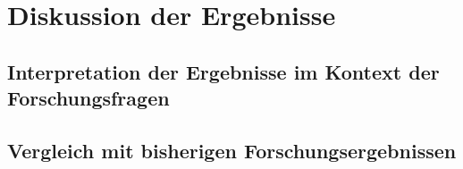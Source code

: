 \section{Diskussion der Ergebnisse}
\label{ch_08Diskussion der Ergebnisse}

\subsection{Interpretation der Ergebnisse im Kontext der Forschungsfragen}
\label{ch_08Interpretation der Ergebnisse im Kontext der Forschungsfragen}

\subsection{Vergleich mit bisherigen Forschungsergebnissen}
\label{ch_08Vergleich mit bisherigen Forschungsergebnissen}
